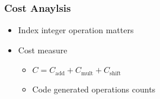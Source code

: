 \begin{frame}
  \frametitle{Cost Anaylsis}
  \begin{itemize}
  \item{Index integer operation matters}
  \setlength\itemsep{1.5em}
  \item{Cost measure
  \begin{itemize}
  \setlength\itemsep{0.5em}
  \item{$C = C_{\text{add}} + C_{\text{mult}} + C_{\text{shift}}$}
  \item{Code generated operations counts}
  \end{itemize}
  }
  \end{itemize}
\end{frame}